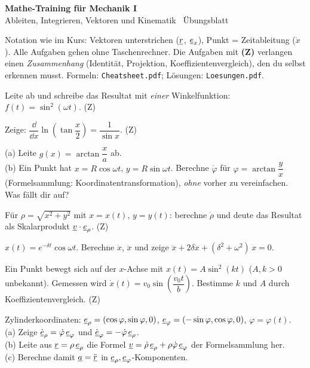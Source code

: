 \documentclass[11pt]{article}
\begin{document}
{\Large\bfseries\color{eth} Mathe-Training für Mechanik I}\\[2pt]
{\small Ableiten, Integrieren, Vektoren und Kinematik \textbullet\ Übungsblatt}

\medskip
\begin{tipp}
Notation wie im Kurs: Vektoren unterstrichen ($\underline{r}$, $\underline{e}_{x}$), Punkt = Zeitableitung ($\dot x$). Alle Aufgaben gehen ohne Taschenrechner. Die Aufgaben mit \textbf{(Z)} verlangen einen \emph{Zusammenhang} (Identität, Projektion, Koeffizientenvergleich), den du selbst erkennen musst. Formeln: \texttt{Cheatsheet.pdf}; Lösungen: \texttt{Loesungen.pdf}.
\end{tipp}

 Leite ab und schreibe das Resultat mit \emph{einer} Winkelfunktion: $f(t)=\sin^2(\omega t)$. \hfill(Z)

 Zeige: $\dfrac{\dd}{\dd x}\ln\!\left(\tan\dfrac{x}{2}\right)=\dfrac{1}{\sin x}$. \hfill(Z)

 (a) Leite $g(x)=\arctan\dfrac{x}{a}$ ab.\\
(b) Ein Punkt hat $x=R\cos\omega t$, $y=R\sin\omega t$. Berechne $\dot\varphi$ für $\varphi=\arctan\dfrac{y}{x}$ (Formelsammlung: Koordinatentransformation), \emph{ohne} vorher zu vereinfachen. Was fällt dir auf?

 Für $\rho=\sqrt{x^2+y^2}$ mit $x=x(t)$, $y=y(t)$: berechne $\dot\rho$ und deute das Resultat als Skalarprodukt $\underline{v}\cdot\underline{e}_{\rho}$. \hfill(Z)

 $x(t)=e^{-\delta t}\cos\omega t$. Berechne $\dot x$, $\ddot x$ und zeige
$\ddot x+2\delta\dot x+(\delta^2+\omega^2)\,x=0$.

 Ein Punkt bewegt sich auf der $x$-Achse mit $x(t)=A\sin^2(kt)$ ($A,k>0$ unbekannt). Gemessen wird $\dot x(t)=v_0\sin\!\left(\dfrac{v_0 t}{b}\right)$. Bestimme $k$ und $A$ durch Koeffizientenvergleich. \hfill(Z)

 Zylinderkoordinaten: $\underline{e}_{\rho}=(\cos\varphi,\sin\varphi,0)$, $\underline{e}_{\varphi}=(-\sin\varphi,\cos\varphi,0)$, $\varphi=\varphi(t)$.\\
(a) Zeige $\dot{\underline{e}}_\rho=\dot\varphi\,\underline{e}_{\varphi}$ und $\dot{\underline{e}}_\varphi=-\dot\varphi\,\underline{e}_{\rho}$.\\
(b) Leite aus $\underline{r}=\rho\,\underline{e}_{\rho}$ die Formel $\underline{v}=\dot\rho\,\underline{e}_{\rho}+\rho\dot\varphi\,\underline{e}_{\varphi}$ der Formelsammlung her.\\
(c) Berechne damit $\underline{a}=\ddot{\underline{r}}$ in $\underline{e}_{\rho},\underline{e}_{\varphi}$-Komponenten.
\end{document}
